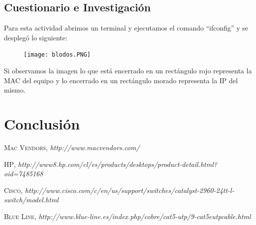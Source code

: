 \documentclass{udpreport}
\begin{document}
	\section{Cuestionario e Investigación}
		Para esta actividad abrimos un terminal y ejecutamos el comando ``ifconfig'' y se desplegó lo siguiente:\\
		\begin{figure}[h]
    		\centering
    	\texttt{[image: blodos.PNG]}
		\end{figure}
		Si observamos la imagen lo que está encerrado en un rectángulo rojo representa la MAC del equipo y lo encerrado en un
		rectángulo morado representa la IP del mismo.
\chapter{Conclusión}
    
\begin{thebibliography}{x}

 \textsc{Mac Vendors},
\textit{http://www.macvendors.com/}

 \textsc{HP},
\textit{http://www8.hp.com/cl/es/products/desktops/product-detail.html?oid=7485168}

 \textsc{Cisco},
\textit{http://www.cisco.com/c/en/us/support/switches/catalyst-2960-24tt-l-switch/model.html}

 \textsc{Blue Line},
\textit{http://www.blue-line.es/index.php/cobre/cat5-utp/9-cat5eutpcable.html}

\end{thebibliography}
\end{document}
